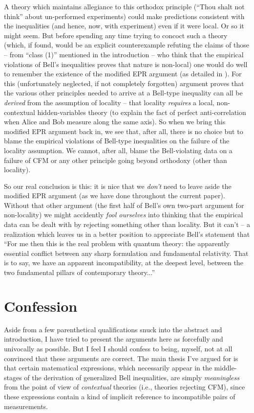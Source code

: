 \documentclass[aps,prc,twocolumn]{revtex4}
\begin{document}
A theory which maintains allegiance to this orthodox principle (``Thou
shalt not think'' about un-performed experiments) could make
predictions consistent with the inequalities (and hence, now, with
experiment) even if it were local.  Or so it might seem.  But before
spending any time trying to concoct such a theory (which, if found,
would be an explicit counterexample refuting the claims of those -- from
``class (1)'' mentioned in the introduction -- who think that the
empirical violations of Bell's inequalities proves that nature is non-local)
one would do well to remember the existence of the modified EPR
argument (as detailed in \cite{nonlocchar}).  For this (unfortunately
neglected, if not completely forgotten) argument proves that the
various other principles needed to arrive at a Bell-type inequality can
all be \emph{derived} from the assumption of locality -- that locality
\emph{requires} a local, non-contextual hidden-variables theory (to
explain the fact of perfect anti-correlation when Alice and Bob measure
along the same axis).  So when we bring this modified EPR argument
back in, we see that, after all, there is no choice but to blame the
empirical violations of Bell-type inequalities on the failure of the
locality assumption.  We cannot, after all, blame the Bell-violating
data on a failure of CFM or any other principle going beyond
orthodoxy (other than locality).  

So our real conclusion is this:  
it is nice that we \emph{don't} need to leave aside the
modified EPR argument (as we have done throughout the current paper).
Without that other argument (the first half of Bell's own two-part
argument for non-locality) we might accidently \emph{fool ourselves}
into thinking that the empirical data can be dealt with by rejecting
something other than locality.  But it can't -- a realization
which leaves us in a better position 
to appreciate Bell's statement that ``For me then this is
the real problem with quantum theory:  the apparently essential
conflict between any sharp formulation and fundamental relativity.
That is to say, we have an apparent incompatibility, at the deepest
level, between the two fundamental pillars of contemporary theory...''
\cite[pg 172]{bell}


\section{Confession}

Aside from a few parenthetical qualifications snuck into the abstract
and introduction, I have tried to present the arguments here as
forcefully and univocally as possible.  But I feel I should confess to
being, myself, not at all convinced that these arguments are 
correct.  The main thesis I've argued for is that certain matematical
expressions, which necessarily appear in the middle-stages of the
derivation of generalized Bell inequalities, are simply
\emph{meaningless} from the point of view of \emph{contextual}
theories (i.e., theories rejecting CFM), since these expressions
contain a kind of implicit reference to incompatible pairs of
measurements.  
\end{document}
